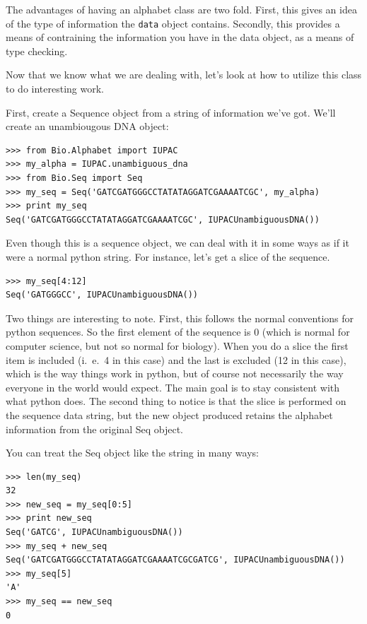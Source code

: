 \documentclass{report}
\begin{document}
The advantages of having an alphabet class are two fold. First, this gives an idea of the type of information the \verb|data| object contains. Secondly, this provides a means of contraining the information you have in the data object, as a means of type checking.


Now that we know what we are dealing with, let's look at how to utilize this class to do interesting work.


First, create a Sequence object from a string of information we've got. We'll create an unambiougous DNA object:

\begin{verbatim}
>>> from Bio.Alphabet import IUPAC
>>> my_alpha = IUPAC.unambiguous_dna
>>> from Bio.Seq import Seq
>>> my_seq = Seq('GATCGATGGGCCTATATAGGATCGAAAATCGC', my_alpha)
>>> print my_seq
Seq('GATCGATGGGCCTATATAGGATCGAAAATCGC', IUPACUnambiguousDNA())
\end{verbatim}


Even though this is a sequence object, we can deal with it in some ways as if it were a normal python string. For instance, let's get a slice of the sequence.

\begin{verbatim}
>>> my_seq[4:12]
Seq('GATGGGCC', IUPACUnambiguousDNA())
\end{verbatim}

Two things are interesting to note. First, this follows the normal conventions for python sequences.  So the first element of the sequence is 0 (which is normal for computer science, but not so normal for biology). When you do a slice the first item is included (i.~e.~4 in this case) and the last is excluded (12 in this case), which is the way things work in python, but of course not necessarily the way everyone in the world would expect. The main goal is to stay consistent with what python does. The second thing to notice is that the slice is performed on the sequence data string, but the new object produced retains the alphabet information from the original Seq object.


You can treat the Seq object like the string in many ways:

\begin{verbatim}
>>> len(my_seq)
32
>>> new_seq = my_seq[0:5]
>>> print new_seq
Seq('GATCG', IUPACUnambiguousDNA())
>>> my_seq + new_seq
Seq('GATCGATGGGCCTATATAGGATCGAAAATCGCGATCG', IUPACUnambiguousDNA())
>>> my_seq[5]
'A'
>>> my_seq == new_seq
0
\end{verbatim}
\end{document}
